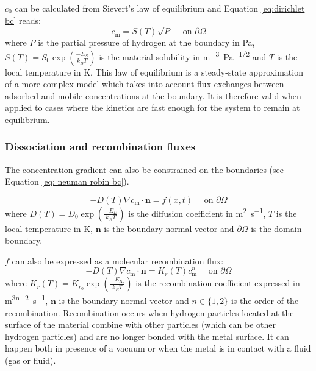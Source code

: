 $c_0$ can be calculated from Sievert's law of equilibrium and Equation \ref{eq:dirichlet bc} reads:
\begin{equation}
    c_\mathrm{m} = S(T) \sqrt{P}\quad \text { on } \partial \Omega
    \label{eq: Sievert's law}
\end{equation}
where $P$ is the partial pressure of hydrogen at the boundary in \si{Pa}, $S(T)=S_0 \exp(\frac{-E_S}{k_B T})$ is the material solubility in \si{m^{-3}.Pa^{-1/2}} and $T$ is the local temperature in \si{K}.
This law of equilibrium is a steady-state approximation of a more complex model which takes into account flux exchanges between adsorbed and mobile concentrations at the boundary.
It is therefore valid when applied to cases where the kinetics are fast enough for the system to remain at equilibrium.

\subsubsection{Dissociation and recombination fluxes}

The concentration gradient can also be constrained on the boundaries (see Equation \ref{eq: neuman robin bc}).

\begin{equation}
    - D(T)\nabla c_\mathrm{m} \cdot \mathbf{n} = f(x, t) \quad \text { on } \partial \Omega
    \label{eq: neuman robin bc}
\end{equation}
where $D(T) = D_0 \exp(\frac{-E_D}{k_B T}) $ is the diffusion coefficient in \si{m^2.s^{-1}}, $T$ is the local temperature in \si{K}, $\mathbf{n}$ is the boundary normal vector and $\partial \Omega$ is the domain boundary.

$f$ can also be expressed as a molecular recombination flux:
\begin{equation}
    - D(T)\nabla c_\mathrm{m} \cdot \mathbf{n} = K_r(T) c_\mathrm{m}^n \quad \text { on } \partial \Omega
    \label{eq: recombination flux}
\end{equation}
where $K_r(T) = K_{r_0} \exp(\frac{-E_{K_r}}{k_B T}) $ is the recombination coefficient expressed in \si{m^{3n-2}.s^{-1}}, $\mathbf{n}$ is the boundary normal vector and $n \in \{1, 2\}$ is the order of the recombination.
Recombination occurs when hydrogen particles located at the surface of the material combine with other particles (which can be other hydrogen particles) and are no longer bonded with the metal surface.
It can happen both in presence of a vacuum or when the metal is in contact with a fluid (gas or fluid).

